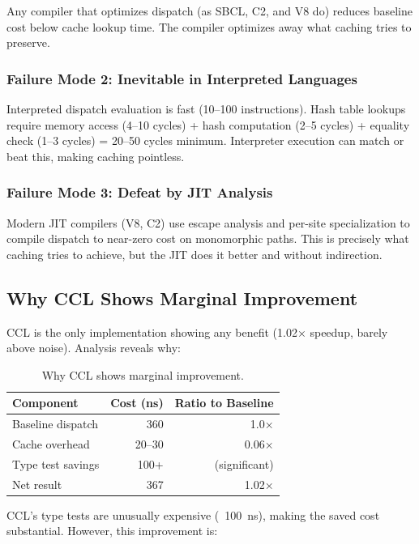 \documentclass[sigplan,final]{acmart}
\begin{document}
Any compiler that optimizes dispatch (as SBCL, C2, and V8 do) reduces baseline cost below cache
lookup time. The compiler optimizes away what caching tries to preserve.

\subsubsection{Failure Mode 2: Inevitable in Interpreted Languages}

Interpreted dispatch evaluation is fast (10--100 instructions). Hash table lookups require memory
access (4--10 cycles) + hash computation (2--5 cycles) + equality check (1--3 cycles) = 20--50
cycles minimum. Interpreter execution can match or beat this, making caching pointless.

\subsubsection{Failure Mode 3: Defeat by JIT Analysis}

Modern JIT compilers (V8, C2) use escape analysis and per-site specialization to compile dispatch
to near-zero cost on monomorphic paths. This is precisely what caching tries to achieve, but the
JIT does it better and without indirection.

\subsection{Why CCL Shows Marginal Improvement}

CCL is the only implementation showing any benefit (1.02× speedup, barely above noise). Analysis
reveals why:

\begin{table}[h]
\centering
\caption{Why CCL shows marginal improvement.}
\label{tab:ccl}
\begin{tabular}{@{}lrr@{}}
\toprule
\textbf{Component} & \textbf{Cost (ns)} & \textbf{Ratio to Baseline} \\
\midrule
Baseline dispatch & 360 & 1.0× \\
Cache overhead & 20--30 & 0.06× \\
Type test savings & 100+ & (significant) \\
Net result & 367 & 1.02× \\
\bottomrule
\end{tabular}
\end{table}

CCL's type tests are unusually expensive (~100~ns), making the saved cost substantial. However,
this improvement is:
\end{document}
